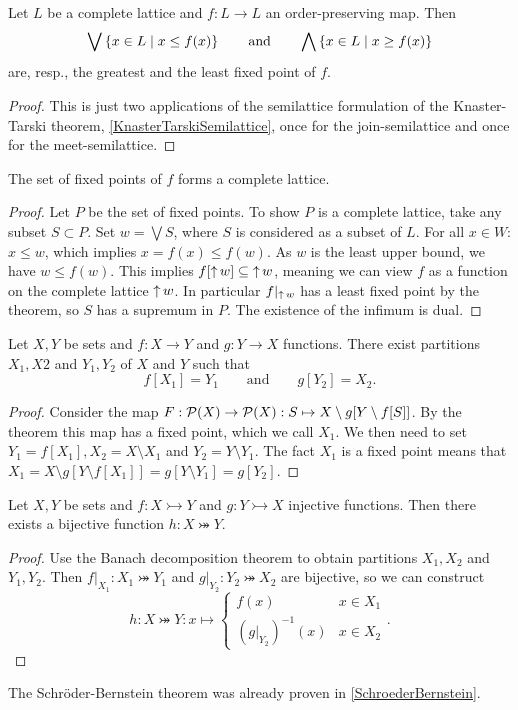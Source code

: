 \begin{theorem}
Let $L$ be a complete lattice and $f:L\to L$ an order-preserving map. Then 
\[ \bigvee \left\{ x\in L \;\middle|\; x\leq f(x) \right\} \qquad\text{and}\qquad \bigwedge \left\{ x\in L \;\middle|\; x\geq f(x) \right\} \]
are, resp., the greatest and the least fixed point of $f$.
\end{theorem}
\begin{proof}
This is just two applications of the semilattice formulation of the Knaster-Tarski theorem, \ref{KnasterTarskiSemilattice}, once for the join-semilattice and once for the meet-semilattice.
\end{proof}
\begin{corollary}
The set of fixed points of $f$ forms a complete lattice.
\end{corollary}
\begin{proof}
Let $P$ be the set of fixed points. To show $P$ is a complete lattice, take any subset $S\subset P$.
Set $w = \bigvee S$, where $S$ is considered as a subset of $L$. For all $x\in W$: $x\leq w$, which implies $x=f(x)\leq f(w)$. As $w$ is the least upper bound, we have $w\leq f(w)$. This implies $f[\operatorname{\uparrow} w]\subseteq \operatorname{\uparrow} w$, meaning we can view $f$ as a function on the complete lattice $\operatorname{\uparrow} w$. In particular $f|_{\operatorname{\uparrow} w}$ has a least fixed point by the theorem, so $S$ has a supremum in $P$. The existence of the infimum is dual.
\end{proof}
\begin{corollary}
Let $X,Y$ be sets and $f:X\to Y$ and $g:Y\to X$ functions. There exist partitions $X_1,X2$ and $Y_1,Y_2$ of $X$ and $Y$ such that
\[ f[X_1] = Y_1 \qquad\text{and}\qquad g[Y_2] = X_2. \]
\end{corollary}
\begin{proof}
Consider the map $F: \operatorname{\mathcal{P}}(X)\to\operatorname{\mathcal{P}}(X): S\mapsto X\setminus g[Y\setminus f[S]]$. By the theorem this map has a fixed point, which we call $X_1$. We then need to set $Y_1 = f[X_1], X_2 = X\setminus X_1$ and $Y_2 = Y\setminus Y_1$. The fact $X_1$ is a fixed point means that $X_1 = X\setminus g[Y\setminus f[X_1]] = g[Y\setminus Y_1] = g[Y_2]$.
\end{proof}
\begin{corollary}
Let $X,Y$ be sets and $f:X\rightarrowtail Y$ and $g:Y\rightarrowtail X$ injective functions. Then there exists a bijective function $h: X\twoheadrightarrowtail Y$.
\end{corollary}
\begin{proof}
Use the Banach decomposition theorem to obtain partitions $X_1,X_2$ and $Y_1,Y_2$. Then $f|_{X_1}: X_1\twoheadrightarrowtail Y_1$ and $g|_{Y_2}: Y_2 \twoheadrightarrowtail X_2$ are bijective, so we can construct
\[ h: X\twoheadrightarrowtail Y: x \mapsto \begin{cases}
f(x) & x\in X_1 \\ (g|_{Y_2})^{-1}(x) & x\in X_2
\end{cases}. \]
\end{proof}
The Schröder-Bernstein theorem was already proven in \ref{SchroederBernstein}.

